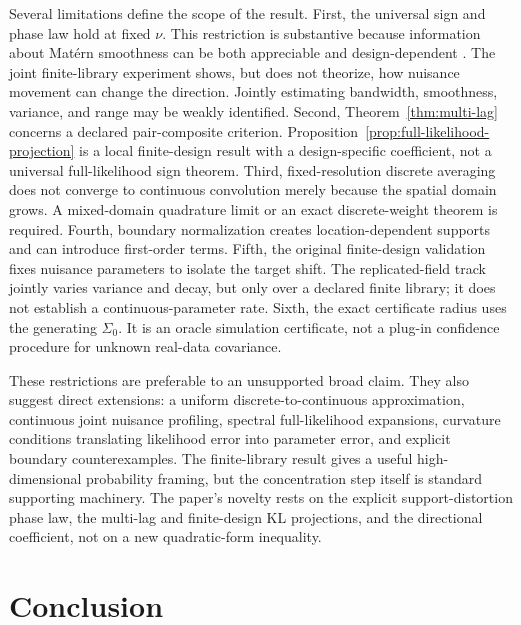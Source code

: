\documentclass[11pt]{article}
\theoremstyle{remark}
\begin{document}
Several limitations define the scope of the result. First, the universal sign
and phase law hold at fixed \(\nu\). This restriction is substantive because
information about Mat\'ern smoothness can be both appreciable and
design-dependent \citep{deoliveira2022information}. The joint finite-library
experiment shows, but does not theorize, how nuisance movement can change the
direction. Jointly estimating bandwidth, smoothness, variance, and range may be
weakly identified.
Second, Theorem~\ref{thm:multi-lag} concerns a declared pair-composite
criterion. Proposition~\ref{prop:full-likelihood-projection} is a local
finite-design result with a design-specific coefficient, not a universal
full-likelihood sign theorem. Third, fixed-resolution discrete averaging does not converge
to continuous convolution merely because the spatial domain grows.  A
mixed-domain quadrature limit or an exact discrete-weight theorem is required.
Fourth, boundary normalization creates location-dependent supports and can
introduce first-order terms.  Fifth, the original finite-design validation
fixes nuisance parameters to isolate the target shift.  The replicated-field
track jointly varies variance and decay, but only over a declared finite
library; it does not establish a continuous-parameter rate.  Sixth, the exact
certificate radius uses the generating \(\Sigma_0\).  It is an oracle
simulation certificate, not a plug-in confidence procedure for unknown
real-data covariance.

These restrictions are preferable to an unsupported broad claim.  They also
suggest direct extensions: a uniform discrete-to-continuous approximation,
continuous joint nuisance profiling, spectral full-likelihood expansions,
curvature conditions translating likelihood error into parameter error, and
explicit boundary counterexamples.  The finite-library result gives a useful
high-dimensional probability framing, but the concentration step itself is
standard supporting machinery. The paper's novelty rests on the explicit
support-distortion phase law, the multi-lag and finite-design KL projections,
and the directional coefficient, not on a new
quadratic-form inequality.

\section{Conclusion}
\end{document}
